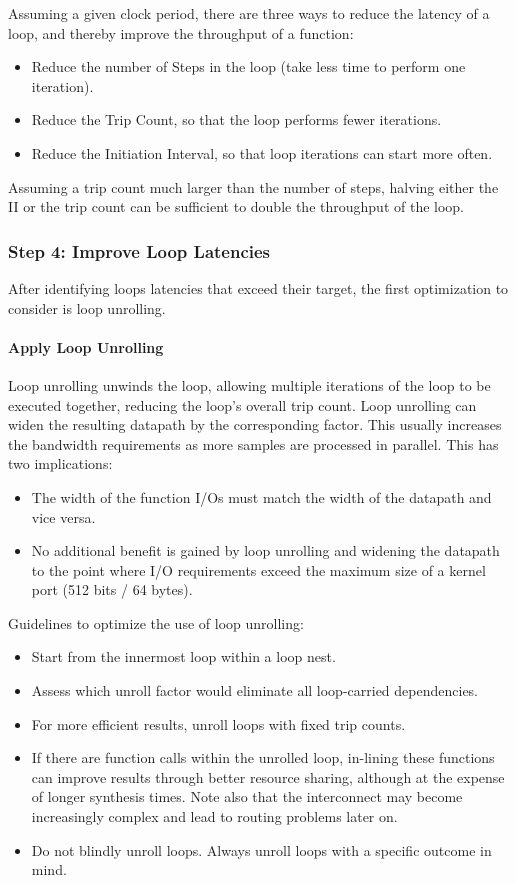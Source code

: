 Assuming a given clock period, there are three ways to reduce the latency of a loop, and thereby improve the throughput of a function:
\begin{itemize}
    \item Reduce the number of Steps in the loop (take less time to perform one iteration).
    \item Reduce the Trip Count, so that the loop performs fewer iterations.
    \item Reduce the Initiation Interval, so that loop iterations can start more often.
\end{itemize}

Assuming a trip count much larger than the number of steps, halving either the II or the trip count can be sufficient to double the throughput of the loop.

\subsubsection{Step 4: Improve Loop Latencies}
After identifying loops latencies that exceed their target, the first optimization to consider is loop unrolling.

\paragraph{Apply Loop Unrolling}
Loop unrolling unwinds the loop, allowing multiple iterations of the loop to be executed together, reducing the loop's overall trip count. Loop unrolling can widen the resulting datapath by the corresponding factor. This usually increases the bandwidth requirements as more samples are processed in parallel. This has two implications:

\begin{itemize}
    \item The width of the function I/Os must match the width of the datapath and vice versa.
    \item No additional benefit is gained by loop unrolling and widening the datapath to the point where I/O requirements exceed the maximum size of a kernel port (512 bits / 64 bytes).
\end{itemize}

Guidelines to optimize the use of loop unrolling:
\begin{itemize}
    \item Start from the innermost loop within a loop nest.
    \item Assess which unroll factor would eliminate all loop-carried dependencies.
    \item For more efficient results, unroll loops with fixed trip counts.
    \item If there are function calls within the unrolled loop, in-lining these functions can improve results through better resource sharing, although at the expense of longer synthesis times. Note also that the interconnect may become increasingly complex and lead to routing
    problems later on.
    \item Do not blindly unroll loops. Always unroll loops with a specific outcome in mind.
\end{itemize}


